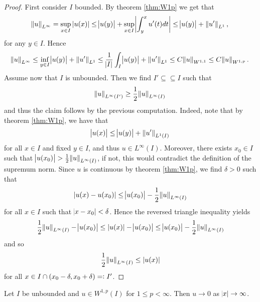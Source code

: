 \begin{proof}
	First consider $I$ bounded. By theorem \ref{thm:W1p} we get that
	\begin{equation*}
		\norm{u}_{L^\infty} = \sup_{x \in I} \abs[0]{u(x)} \leq \abs{u(y)} + \sup_{x \in I} \abs[3]{\int_y^x u'(t) dt} \leq \abs{u(y)} + \norm[0]{u'}_{L^1}, 
	\end{equation*}
	\noindent for any $y \in I$. Hence
	\begin{equation*}
		\norm{u}_{L^\infty} \leq \inf_{y \in I} \abs{u(y)} + \norm[0]{u'}_{L^1} \leq \frac{1}{\abs{I}}\int_I \abs{u(y)} + \norm[0]{u'}_{L^1} \leq C \norm{u}_{W^{1,1}} \leq C \norm{u}_{W^{1,p}}.
	\end{equation*}
	Assume now that $I$ is unbounded. Then we find $I' \subseteq \subseteq I$ such that 
	\begin{equation*}
		\norm{u}_{L^\infty(I')} \geq \frac{1}{2}\norm{u}_{L^\infty(I)}
	\end{equation*}
	\noindent and thus the claim follows by the previous computation. Indeed, note that by theorem \ref{thm:W1p}, we have that 
	\begin{equation*}
		\abs{u(x)} \leq \abs{u(y)} + \norm[0]{u'}_{L^1(I)}
	\end{equation*}
	\noindent for all $x \in I$ and fixed $y \in I$, and thus $u \in L^\infty(I)$. Moreover, there exists $x_0 \in I$ such that $\abs{u(x_0)} > \frac{1}{2}\norm{u}_{L^\infty(I)}$, if not, this would contradict the definition of the supremum norm. Since $u$ is continuous by theorem \ref{thm:W1p}, we find $\delta > 0$ such that
	\begin{equation*}
		\abs[0]{u(x) - u(x_0)} \leq \abs{u(x_0)} - \frac{1}{2}\norm{u}_{L^\infty(I)}
	\end{equation*}
	\noindent for all $x \in I$ such that $\abs{x - x_0} < \delta$. Hence the reversed triangle inequality yields
	\begin{equation*}
		\frac{1}{2}\norm{u}_{L^\infty(I)} - \abs{u(x_0)} \leq \abs[0]{u(x)} - \abs{u(x_0)} \leq \abs{u(x_0)} - \frac{1}{2}\norm{u}_{L^\infty(I)}
	\end{equation*}
	\noindent and so
	\begin{equation*}
		\frac{1}{2}\norm{u}_{L^\infty(I)} \leq \abs[0]{u(x)}
	\end{equation*}
	\noindent for all $x \in I \cap \intoo{x_0 - \delta,x_0 + \delta} =: I'$.
\end{proof}

\begin{corollary}
	Let $I$ be unbounded and $u \in W^{1,p}(I)$ for $1 \leq p < \infty$. Then $u \to 0$ as $\abs{x} \to \infty$.
\end{corollary}


